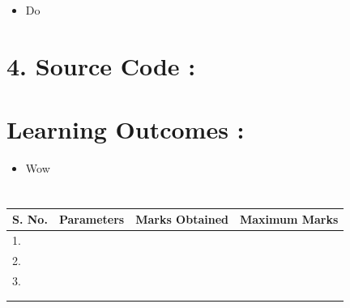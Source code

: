 \documentclass[14pt]{extarticle}
\begin{document}
\begin{itemize}
  \item Do
\end{itemize}

\newpage
\section*{\normalsize 4. Source Code :}





\section*{\normalsize Learning Outcomes :}
  
  \begin{itemize}
    \item Wow
  \end{itemize}

\section*{}

\begin{center}

\begin{tabular}{ |p{2.5cm}|p{4cm}|p{5cm}|p{5cm}|} 
 \hline
 S. No. & Parameters & Marks Obtained & Maximum Marks \\
 \hline
 1.&&&\\
 \hline
 2.&&&\\
 \hline
 3.&&&\\
 \hline
 &&&\\
 &&&\\
 \hline
\end{tabular}
\end{center}
\end{document}

